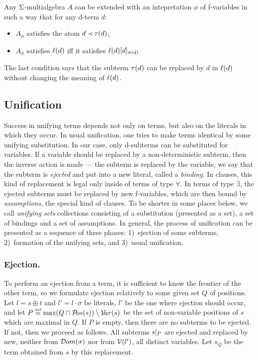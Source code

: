 \begin{lemma}\label{le:f-variables}
Any \(\Sigma\)-multialgebra $A$ can be extended with an intepretation $\phi$
of f-variables in such a way that for any d-term $d:$ 
\begin{itemize}\smallerspaces
\item $A_\phi$ satisfies the atom \(d\mathbin{\prec} \tau(d)\);
\item $A_\phi$ satisfies \(\ell(d)\) iff it satisfies \(\ell(d) [d]_{\pi(d)}\) 
\end{itemize}
 \end{lemma}
The last condition says that the subterm \(\tau(d)\) can be replaced by $d$ in
\(\ell(d)\) without changing the meaning of \(\ell(d)\). 

\subsection{Unification}

Success in unifying terms depends not only on terms, but also on the literals in which
they occur.  In usual unification, one tries to make terms identical by
some unifying substitution.  In our case, only d-subterms can be substituted
for variables.  If a variable  should be replaced by a
non-deterministic subterm, then the inverse action is made --- the subterm is
replaced by the variable, we say that the subterm is {\em ejected} and put
into a new literal, called a {\em binding}.  In clauses, this kind of
replacement is legal only inside of terms of type $\forall$.  In terms of
type $\exists$, the ejected subterms must be replaced by new f-variables,
which are then bound by {\em assumptions}, the special kind of clauses.  To
be shorter in some places below, we call {\em unifying sets} collections
consisting of a substitution (presented as a set), a set of bindings and a
set of assumptions.  In general, the process of unification can be presented
as a sequence of three phases: 1)~ejection of some subterms, 2)~formation of
the unifying sets, and 3)~usual unification.
%
\subsubsection{Ejection.}
%
To perform an ejection from a term, it is sufficient to know the frontier of
the other term, so we formulate ejection relatively to some given set $Q$ of
positions.  Let \(l= s\oplus t\) and \(l'=l\cdot \sigma\) be literals, $l'$
be the one where ejection should occur, and let \(P \mathrel {\stackrel {\mbox {\tiny def}}{=}} \max(Q\cap{\sl{\cal P}\!os}(s))\setminus {\sl{\cal V}\!ar}(s)\) be the set of non-variable positions of $s$ which are
maximal in $Q$.  If $P$ is empty, then there are no subterms to be ejected.
If not, then we proceed as follows.  All subterms \(s|_{P}\) are ejected
and replaced by new, neither from \({\sl{\cal D}om} (\sigma)\) nor from \({\cal V}(l')\), all
distinct variables.  Let $s_Q$ be the term obtained from $s$ by this
replacement.

